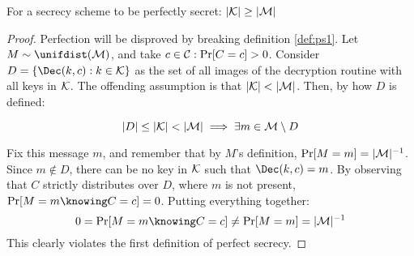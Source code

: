\begin{theorem}
    For a secrecy scheme to be perfectly secret: $|\mathcal{K}| \geq |\mathcal{M}|$
\end{theorem}
\begin{proof}
    Perfection will be disproved by breaking definition \ref{def:ps1}. Let $M \sim \unifdist(\M)$, and take $c \in \mathcal{C} : \Pr[C = c] > 0$. Consider $D = \{\Dec(k, c) : k \in \K\}$ as the set of all images of the decryption routine with all keys in $\mathcal{K}$. The offending assumption is that $|\mathcal{K}| < |\mathcal{M}|$. Then, by how $D$ is defined:

    \[
        |D| \leq |\mathcal{K}| < |\mathcal{M}| \implies \exists m \in \mathcal{M} \setminus D
    \]

    Fix this message $m$, and remember that by $M$'s definition, $\Pr[M = m] = |\mathcal{M}|^{-1}$. Since $m \notin D$, there can be no key in $\mathcal{K}$ such that $\Dec(k, c) = m$. By observing that $C$ strictly distributes over $D$, where $m$ is not present, $\Pr[M = m \knowing C = c] = 0$. Putting everything together:
    \[
        0 = \Pr[M = m \knowing C = c] \neq \Pr[M = m] = |\M|^{-1}
    \]
    This clearly violates the first definition of perfect secrecy.
\end{proof}
